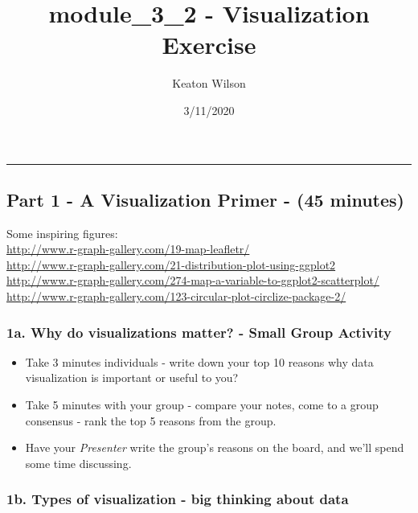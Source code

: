 \documentclass[]{article}
\title{module\_3\_2 - Visualization Exercise}
\author{Keaton Wilson}
\date{3/11/2020}
\providecommand{\tightlist}{%
  \setlength{\itemsep}{0pt}\setlength{\parskip}{0pt}}
\begin{document}
\maketitle

\begin{center}\rule{0.5\linewidth}{\linethickness}\end{center}

\hypertarget{part-1---a-visualization-primer---45-minutes}{%
\subsection{Part 1 - A Visualization Primer - (45
minutes)}\label{part-1---a-visualization-primer---45-minutes}}

Some inspiring figures:\\
\url{http://www.r-graph-gallery.com/19-map-leafletr/}~\\
\url{http://www.r-graph-gallery.com/21-distribution-plot-using-ggplot2}~\\
\url{http://www.r-graph-gallery.com/274-map-a-variable-to-ggplot2-scatterplot/}~\\
\url{http://www.r-graph-gallery.com/123-circular-plot-circlize-package-2/}

\hypertarget{a.-why-do-visualizations-matter---small-group-activity}{%
\subsubsection{1a. Why do visualizations matter? - Small Group
Activity}\label{a.-why-do-visualizations-matter---small-group-activity}}

\begin{itemize}
\tightlist
\item
  Take 3 minutes individuals - write down your top 10 reasons why data
  visualization is important or useful to you?
\item
  Take 5 minutes with your group - compare your notes, come to a group
  consensus - rank the top 5 reasons from the group.
\item
  Have your \emph{Presenter} write the group's reasons on the board, and
  we'll spend some time discussing.
\end{itemize}

\hypertarget{b.-types-of-visualization---big-thinking-about-data}{%
\subsubsection{1b. Types of visualization - big thinking about
data}\label{b.-types-of-visualization---big-thinking-about-data}}
\end{document}
